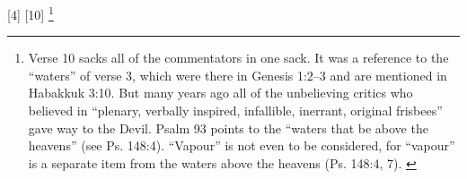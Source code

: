 [4] 
[10] \footnote{Verse 10 sacks all of the commentators in one sack. It was a reference to the “waters” of verse 3, which were there in Genesis 1:2–3 and are mentioned in Habakkuk 3:10. But many years ago all of the unbelieving critics who believed in “plenary, verbally inspired, infallible, inerrant, original frisbees” gave way to the Devil. Psalm 93 points to the “waters that be above the heavens” (see Ps. 148:4). “Vapour” is not even to be considered, for “vapour” is a separate item from the waters above the heavens (Ps. 148:4, 7).  \cite{Ruckman1992Psalms}}

